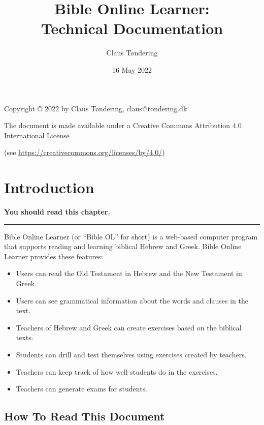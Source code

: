 \documentclass[11pt,oneside,a4paper]{memoir}
\title{Bible Online Learner:\\Technical Documentation}
\author{Claus Tøndering}
\date{16 May 2022}
\begin{document}
\begin{titlingpage*}
\maketitle

\begin{center}
Copyright © 2022 by Claus Tøndering, claus@tondering.dk

\vspace{5mm}

The document is made available under a Creative Commons Attribution 4.0 International License

(see \url{https://creativecommons.org/licenses/by/4.0/})
\end{center}
\end{titlingpage*}


\clearpage
\tableofcontents
{} %

\chapter{Introduction}

\textbf{You should read this chapter.}
\plainbreak{3}

Bible Online Learner (or ``Bible OL'' for short) is a web-based computer program that supports
reading and learning biblical Hebrew and Greek. Bible Online Learner provides these features:


\begin{itemize}
\item Users can read the Old Testament in Hebrew and the New Testament in Greek.
\item Users can see grammatical information about the words and clauses in the text.
\item Teachers of Hebrew and Greek can create exercises based on the biblical texts.
\item Students can drill and test themselves using exercises created by teachers.
\item Teachers can keep track of how well students do in the exercises.
\item Teachers can generate exams for students.
\end{itemize}


\section{How To Read This Document}
\end{document}
